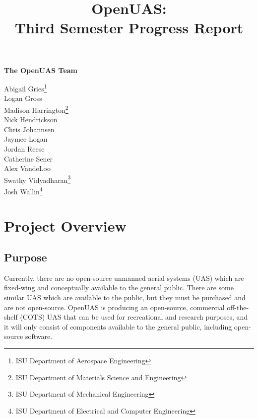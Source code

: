 \documentclass{article}
\title{OpenUAS:\\Third Semester Progress Report }
\author{ }
\begin{document}
\maketitle

\newpage

\begin{center}
\Large \textbf{The OpenUAS Team}

\vspace{1cm}

\large{
Abigail Gries\footnote[1]{ISU Department of Aerospace Engineering}\\ Logan Gross\footnotemark[1]\\ Madison Harrington\footnote[2]{ISU Department of Materials Science and Engineering}\\ Nick Hendrickson\footnotemark[1]\\ Chris Johannsen\footnotemark[1]\\ Jaymee Logan\footnotemark[1]\\ Jordan Reese\footnotemark[1]\\ Catherine Sener\footnotemark[1]\\ Alex VandeLoo\footnotemark[1]\\ Swathy Vidyadharan\footnote[3]{ISU Department of Mechanical Engineering}\\ Josh Wallin\footnote[4]{ISU Department of Electrical and Computer Engineering}\\ 
}\par

\end{center}

\newpage


\tableofcontents

\section{Project Overview}

\subsection{Purpose}
Currently, there are no open-source unmanned aerial systems (UAS) which are fixed-wing and conceptually available to the general public. There are some similar UAS which are available to the public, but they must be purchased and are not open-source. OpenUAS is producing an open-source, commercial off-the-shelf (COTS) UAS that can be used for recreational and research purposes, and it will only consist of components available to the general public, including open-source software.
\end{document}
